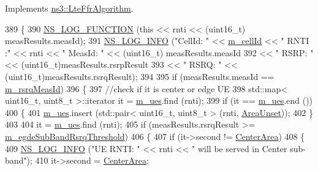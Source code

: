 Implements \hyperlink{classns3_1_1LteFfrAlgorithm_aae66b1b7edbacf07b96e171d89de3f91}{ns3\+::\+Lte\+Ffr\+Algorithm}.


\begin{DoxyCode}
389 \{
390   \hyperlink{log-macros-disabled_8h_a90b90d5bad1f39cb1b64923ea94c0761}{NS\_LOG\_FUNCTION} (\textcolor{keyword}{this} << rnti << (uint16\_t) measResults.measId);
391   \hyperlink{group__logging_gafbd73ee2cf9f26b319f49086d8e860fb}{NS\_LOG\_INFO} (\textcolor{stringliteral}{"CellId: "} << \hyperlink{classns3_1_1LteFfrAlgorithm_a0d6bc37b568679f27a18808d9cb36803}{m\_cellId} << \textcolor{stringliteral}{" RNTI :"} << rnti << \textcolor{stringliteral}{" MeasId: "} << (uint16\_t) 
      measResults.measId
392                           << \textcolor{stringliteral}{" RSRP: "} << (uint16\_t)measResults.rsrpResult
393                           << \textcolor{stringliteral}{" RSRQ: "} << (uint16\_t)measResults.rsrqResult);
394 
395   \textcolor{keywordflow}{if} (measResults.measId == \hyperlink{classns3_1_1LteFfrDistributedAlgorithm_a62723bbd0b2db2380e7b274ed31a3533}{m\_rsrqMeasId})
396     \{
397       \textcolor{comment}{//check if it is center or edge UE}
398       std::map< uint16\_t, uint8\_t >::iterator it = \hyperlink{classns3_1_1LteFfrDistributedAlgorithm_a23b1424852e6736058ca1671be44fe5c}{m\_ues}.find (rnti);
399       \textcolor{keywordflow}{if} (it == \hyperlink{classns3_1_1LteFfrDistributedAlgorithm_a23b1424852e6736058ca1671be44fe5c}{m\_ues}.end ())
400         \{
401           \hyperlink{classns3_1_1LteFfrDistributedAlgorithm_a23b1424852e6736058ca1671be44fe5c}{m\_ues}.insert (std::pair< uint16\_t, uint8\_t > (rnti, \hyperlink{classns3_1_1LteFfrDistributedAlgorithm_a8ff512b8e668c4e56fc5e1bb6c577ad6a4c4c7e985787c181ddf09fd1dcbf84c8}{AreaUnset}));
402         \}
403 
404       it = \hyperlink{classns3_1_1LteFfrDistributedAlgorithm_a23b1424852e6736058ca1671be44fe5c}{m\_ues}.find (rnti);
405       \textcolor{keywordflow}{if} (measResults.rsrqResult >= \hyperlink{classns3_1_1LteFfrDistributedAlgorithm_ade96e62e63dde620a95c7e6cab54f1b8}{m\_egdeSubBandRsrqThreshold})
406         \{
407           \textcolor{keywordflow}{if} (it->second != \hyperlink{classns3_1_1LteFfrDistributedAlgorithm_a8ff512b8e668c4e56fc5e1bb6c577ad6ae8ce3c1680b108bb7e87db54e8f0e886}{CenterArea})
408             \{
409               \hyperlink{group__logging_gafbd73ee2cf9f26b319f49086d8e860fb}{NS\_LOG\_INFO} (\textcolor{stringliteral}{"UE RNTI: "} << rnti << \textcolor{stringliteral}{" will be served in Center sub-band"});
410               it->second = \hyperlink{classns3_1_1LteFfrDistributedAlgorithm_a8ff512b8e668c4e56fc5e1bb6c577ad6ae8ce3c1680b108bb7e87db54e8f0e886}{CenterArea};

\end{DoxyCode}
